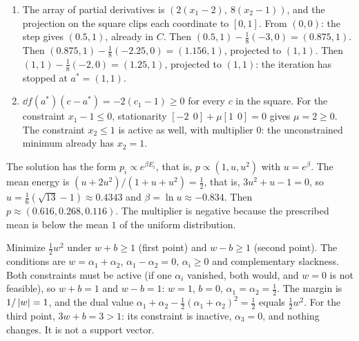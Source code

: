 \begin{enumerate}[nosep]
  \item The array of partial derivatives is
        $(2(x_1 - 2),\ 8(x_2 - 1))$, and the projection on the square
        clips each coordinate to $[0, 1]$. From $(0, 0)$: the step gives
        $(0.5, 1)$, already in $C$. Then $(0.5, 1) - \frac18(-3, 0)
        = (0.875, 1)$. Then $(0.875, 1) - \frac18(-2.25, 0)
        = (1.156, 1)$, projected to $(1, 1)$. Then
        $(1, 1) - \frac18(-2, 0) = (1.25, 1)$, projected to $(1, 1)$:
        the iteration has stopped at $a^* = (1, 1)$.
  \item $\dd f(a^*)(c - a^*) = -2(c_1 - 1)\geq0$ for every $c$ in the
        square. For the constraint $x_1 - 1\leq0$, stationarity
        $[-2\ \ 0] + \mu[1\ \ 0] = 0$ gives $\mu = 2\geq0$. The
        constraint $x_2\leq1$ is active as well, with multiplier $0$:
        the unconstrained minimum already has $x_2 = 1$.
\end{enumerate}

The solution has the form $p_i\propto e^{\beta E_i}$, that is,
$p\propto(1, u, u^2)$ with $u = e^\beta$. The mean energy is
$(u + 2u^2)/(1 + u + u^2) = \frac12$, that is, $3u^2 + u - 1 = 0$, so
$u = \frac16(\sqrt{13} - 1)\approx0.4343$ and
$\beta = \ln u\approx-0.834$. Then
$p\approx(0.616, 0.268, 0.116)$. The multiplier is negative because the
prescribed mean is below the mean $1$ of the uniform distribution.

Minimize $\frac12w^2$ under $w + b\geq1$ (first point) and
$w - b\geq1$ (second point). The conditions are
$w = \alpha_1 + \alpha_2$, $\alpha_1 - \alpha_2 = 0$,
$\alpha_i\geq0$ and complementary slackness. Both constraints must be
active (if one $\alpha_i$ vanished, both would, and $w = 0$ is not
feasible), so $w + b = 1$ and $w - b = 1$: $w = 1$, $b = 0$,
$\alpha_1 = \alpha_2 = \frac12$. The margin is $1/\left|w\right| = 1$, and the
dual value $\alpha_1 + \alpha_2 - \frac12(\alpha_1 + \alpha_2)^2
= \frac12$ equals $\frac12w^2$. For the third point,
$3w + b = 3 > 1$: its constraint is inactive, $\alpha_3 = 0$, and nothing
changes. It is not a support vector.

\section{}

